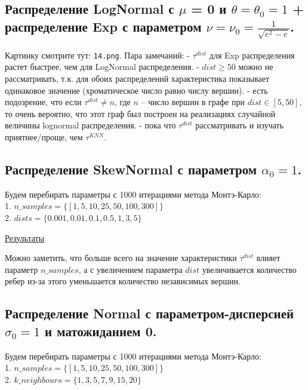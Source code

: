 \documentclass{report}
\begin{document}
\subsection{Распределение LogNormal с $\mu$ = 0 и $\theta = \theta_0 = 1$ + распределение Exp с параметром $\nu = \nu_0 = \frac{1}{\sqrt{e^2 - e}}$.}
Картинку смотрите тут: \texttt{14.png}.
\newline
\newline
Пара замечаний:
\newline
\newline
- $\tau^{dist}$ для Exp распределения растет быстрее, чем для LogNormal распределения.
\newline
\newline
- $dist \ge 50$ можно не рассматривать, т.к. для обоих распределений характеристика показывает одинаковое значение (хроматическое число равно числу вершин).
\newline
\newline
- есть подозрение, что если $\tau^{dist} \ne n$, где $n$ -- число вершин в графе при $dist \in [5, 50]$, то очень вероятно, что этот граф был построен на реализациях случайной величины lognormal распределения.
\newline
\newline
- пока что $\tau^{dist}$ рассматривать и изучать приятнее/проще, чем $\tau^{KNN}$.

\subsection{Распределение SkewNormal с параметром $\alpha_0=1$.}
Будем перебирать параметры с 1000 итерациями метода Монтэ-Карло:\\
1. $n\_samples = \{[1, 5, 10, 25, 50, 100, 300]\}$\\
2. $dists = \{0.001, 0.01, 0.1, 0.5, 1, 3, 5\}$

\href{https://github.com/misshimichka/dm-random-graphs/blob/dmitrii/report/report/fix_alpha_skewnorm_mis_dist.png}{Результаты}

Можно заметить, что больше всего на значение характеристики $\tau^{dist}$ влияет параметр $n\_samples$, а с увеличением параметра $dist$ увеличивается количество ребер из-за этого уменьшается количество независимых вершин. 

\subsection{Распределение Normal с параметром-дисперсией $\sigma_0=1$ и матожиданием 0.}
Будем перебирать параметры с 1000 итерациями метода Монтэ-Карло:\\
1. $n\_samples = \{[1, 5, 10, 25, 50, 100, 300]\}$\\
2. $k\_neighbours = \{1, 3, 5, 7, 9, 15, 20\}$
\end{document}
